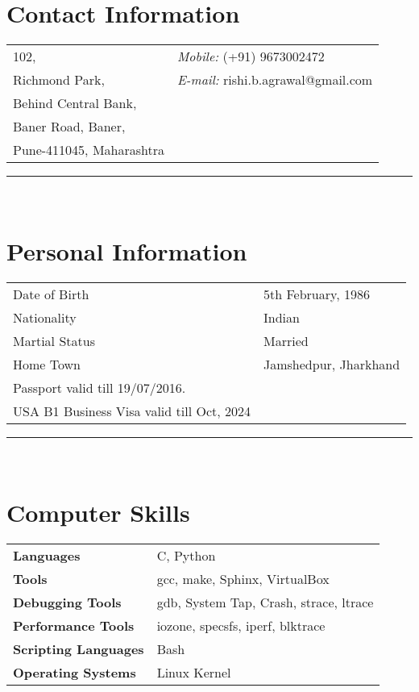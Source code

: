 \documentclass[letterpaper,margin,line]{RES}
\def\mmmyline{\rule{\textwidth}{1pt}\\}
\begin{document}

\begin{resume}
\section{\sc Contact Information}
\begin{tabular}{@{}p{2in}p{4in}}
102,                      & {\it Mobile:}  (+91) 9673002472 \\            
Richmond Park,      & {\it E-mail:}  rishi.b.agrawal@gmail.com \\       
Behind Central Bank,          &  \\ 
Baner Road, Baner,          &  \\ 
Pune-411045, Maharashtra    & \\ 
\end{tabular}
\mmmyline

\section{\sc Personal Information}
\begin{tabular}{@{}p{2in}p{4in}}
Date of Birth  & 5th February, 1986 \\            
Nationality    & Indian  \\            
Martial Status & Married \\            
Home Town      & Jamshedpur, Jharkhand\\
Passport valid till 19/07/2016.\\ 
USA B1 Business Visa valid till Oct, 2024
\end{tabular}
\mmmyline

{ \bf 	
\section{\sc Computer Skills}
\vspace{.04in}}

\begin{tabular}{@{}p{2in}p{4in}}
{\bf Languages}                             & C, Python \\
{\bf Tools}                                 & gcc, make, Sphinx, VirtualBox \\
{\bf Debugging Tools}                       & gdb, System Tap, Crash, strace, ltrace \\
{\bf Performance Tools}                     & iozone, specsfs, iperf, blktrace \\
{\bf Scripting Languages}                   & Bash \\
{\bf Operating Systems}                     & Linux Kernel \\
\end{tabular}


\end{resume}
\end{document}
